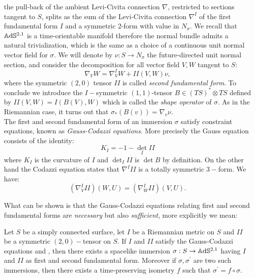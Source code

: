 the pull-back of the ambient Levi-Civita connection $\nabla$, restricted to sections tangent to $S$, splits as the sum of the Levi-Civita connection $\nabla^I$ of the first fundamental form $I$ and a symmetric 2-form with value in $N_\sigma$. We recall that $\mathbb{A}\mathrm{d}\mathbb{S}^{2,1}$ is a time-orientable manifold therefore the normal bundle admits a natural trivialization, which is the same as a choice of a continuous unit normal vector field for $\sigma.$ We will denote by $\nu:S\to N_\sigma$ the future-directed unit normal section, and consider the decomposition for all vector field $V,W$ tangent to $S$: 
\[
    \nabla_V W=\nabla^I_V W+II(V,W)\nu,
\]
where the symmetric $(2,0)$ tensor $II$ is called \textit{second fundamental form}. To conclude we introduce the $I-$symmetric $(1,1)$-tensor $B\in (TS)^*\otimes TS$ defined by $II(V,W)=I(B(V),W)$ which is called the \textit{shape operator} of $\sigma.$ As in the Riemannian case, it turns out that $\sigma_*(B(v))=\nabla_v\nu.$\\  
The first and second fundamental form of an immersion $\sigma$ satisfy constraint equations, known as \textit{Gauss-Codazzi equations}. More precisely the Gauss equation consists of the identity: 
\begin{equation}\label{Gauss}
    K_I=-1-\det_I II
\end{equation}
where $K_I$ is the curvature of $I$ and $\det_I II$ is $\det B$ by definition. On the other hand the Codazzi equation states that $\nabla^III$ is a totally symmetric $3-$form. We have: 
\begin{equation}\label{Codazzi}
    (\nabla_V^{I}II)(W,U)=(\nabla_W^I II)(V,U).  
\end{equation}

What can be shown is that the Gauss-Codazzi equations relating first and second fundamental forms are \textit{necessary} but also \textit{sufficient}, more explicitly we mean:

\begin{theorem}\label{immcondition}
    Let $S$ be a simply connected surface, let $I$ be a Riemannian metric on $S$ and $II$  be a symmetric $(2,0)-$tensor on $S$. If $I$ and $II$ satisfy the Gauss-Codazzi equations  and , then there exists a spacelike immersion $\sigma:S\to\mathbb{A}\mathrm{d}\mathbb{S}^{2,1}$ having $I$ and $II$ as first and second fundamental form. Moreover if $\sigma,\sigma^{\prime}$ are two such immersions, then there exists a time-preserving isometry $f$ such that $\sigma^{\prime} =f\circ\sigma$.  
\end{theorem}

